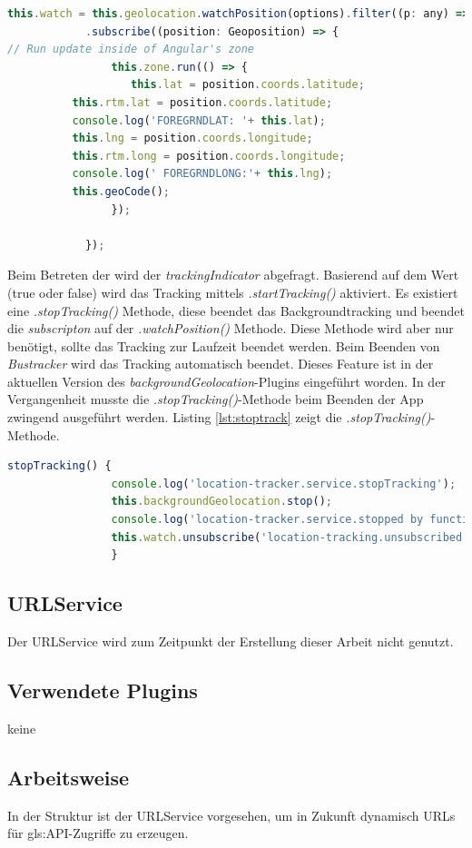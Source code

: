 \begin{lstlisting}[float, language= JavaScript, caption= .watch()-Methode, label=lst:watch]
        this.watch = this.geolocation.watchPosition(options).filter((p: any) => p.code === undefined)
            .subscribe((position: Geoposition) => {
// Run update inside of Angular's zone
                this.zone.run(() => {
                   this.lat = position.coords.latitude;
          this.rtm.lat = position.coords.latitude;
          console.log('FOREGRNDLAT: '+ this.lat);
          this.lng = position.coords.longitude;
          this.rtm.long = position.coords.longitude;
          console.log(' FOREGRNDLONG:'+ this.lng);
          this.geoCode();
                });

            });
\end{lstlisting}

Beim Betreten der  wird der \emph{trackingIndicator} abgefragt. Basierend auf dem Wert (true oder false) wird das Tracking mittels \emph{.startTracking()} aktiviert. Es existiert eine \emph{.stopTracking()} Methode, diese beendet das Backgroundtracking und beendet die \emph{subscripton} auf der \emph{.watchPosition()} Methode. Diese Methode wird aber nur benötigt, sollte das Tracking zur Laufzeit beendet werden. Beim Beenden von \emph{Bustracker} wird das Tracking automatisch beendet. Dieses Feature ist in der aktuellen Version des \emph{backgroundGeolocation}-Plugins eingeführt worden. In der Vergangenheit musste die \emph{.stopTracking()}-Methode beim Beenden der App zwingend ausgeführt werden. Listing \ref{lst:stoptrack} zeigt die \emph{.stopTracking()}-Methode.

\begin{lstlisting}[float, language= JavaScript, caption= .stopTracking()-Methode, label=lst:stoptrack]
stopTracking() {
        		console.log('location-tracker.service.stopTracking');
        		this.backgroundGeolocation.stop();
        		console.log('location-tracker.service.stopped by function call stopTracking()');
        		this.watch.unsubscribe('location-tracking.unsubscribed');
    			}	
\end{lstlisting}

\subsection{URLService}
\label{URLService}
Der URLService wird zum Zeitpunkt der Erstellung dieser Arbeit nicht genutzt.
\subsection{Verwendete Plugins}
keine
\subsection{Arbeitsweise}
In der Struktur ist der URLService vorgesehen, um in Zukunft dynamisch URLs für \gls{gls:API}-Zugriffe zu erzeugen. 
